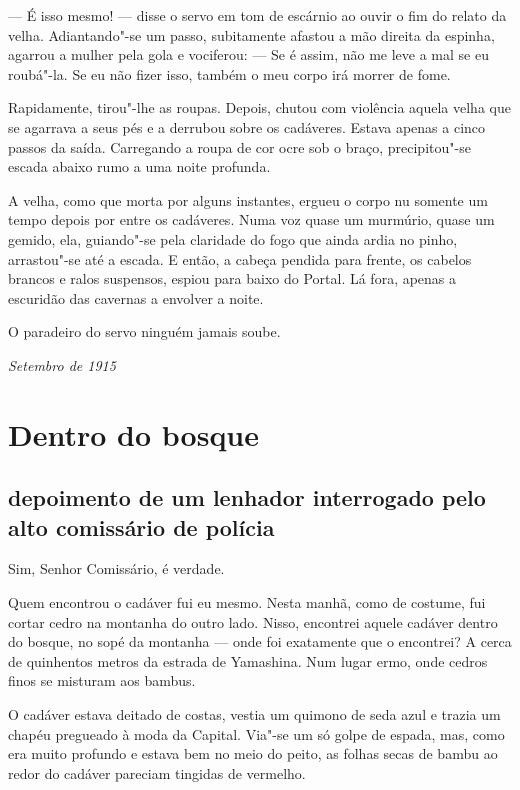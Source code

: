 --- É isso mesmo! --- disse o servo em tom de escárnio ao ouvir o fim do
relato da velha. Adiantando"-se um passo, subitamente afastou a mão
direita da espinha, agarrou a mulher pela gola e vociferou: --- Se é
assim, não me leve a mal se eu roubá"-la. Se eu não fizer isso, também o
meu corpo irá morrer de fome.

Rapidamente, tirou"-lhe as roupas. Depois, chutou com violência aquela
velha que se agarrava a seus pés e a derrubou sobre os cadáveres.
Estava apenas a cinco passos da saída. Carregando a roupa de cor ocre
sob o braço, precipitou"-se escada abaixo rumo a uma noite profunda.

A velha, como que morta por alguns instantes, ergueu o corpo nu somente
um tempo depois por entre os cadáveres. Numa voz quase um murmúrio,
quase um gemido, ela, guiando"-se pela claridade do fogo que ainda ardia
no pinho, arrastou"-se até a escada. E então, a cabeça pendida para
frente, os cabelos brancos e ralos suspensos, espiou para baixo do
Portal. Lá fora, apenas a escuridão das cavernas a envolver a noite.

O paradeiro do servo ninguém jamais soube.

\begin{flushright}
\textit{Setembro de 1915}
\end{flushright}

\chapter{Dentro do bosque}

\section*{depoimento de um lenhador interrogado pelo alto comissário de polícia}

Sim, Senhor Comissário, é verdade.

Quem encontrou o cadáver fui eu mesmo. Nesta manhã, como de costume, fui
cortar cedro na montanha do outro lado. Nisso, encontrei aquele cadáver
dentro do bosque, no sopé da montanha --- onde foi exatamente que o
encontrei? A cerca de quinhentos metros da estrada de Yamashina. Num
lugar ermo, onde cedros finos se misturam aos bambus.

O cadáver estava deitado de costas, vestia um quimono de seda azul e
trazia um chapéu pregueado à moda da Capital. Via"-se um só golpe de
espada, mas, como era muito profundo e estava bem no meio do peito, as
folhas secas de bambu ao redor do cadáver pareciam tingidas de
vermelho.


